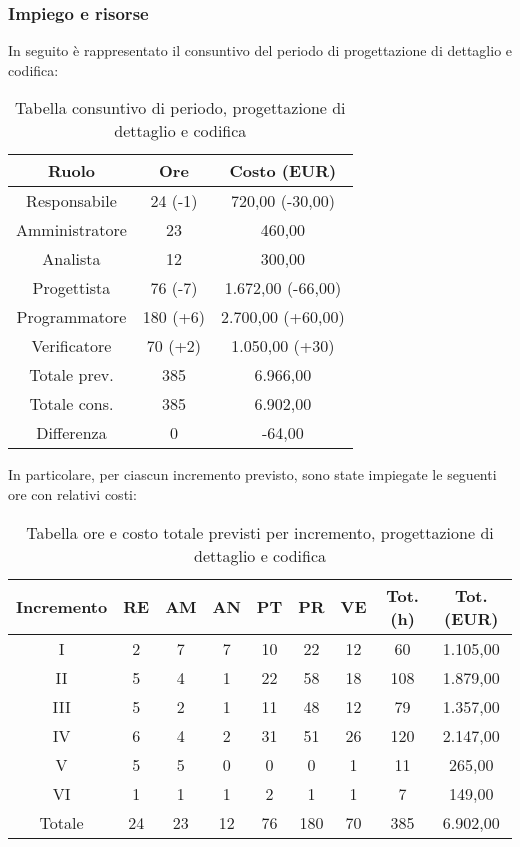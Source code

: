\subsubsection{Impiego e risorse}
In seguito è rappresentato il consuntivo del periodo di progettazione di dettaglio e codifica:
\begin{table}[h]
	\caption{Tabella consuntivo di periodo, progettazione di dettaglio e codifica}  
	\begin{center}
		\begin{tabular}{ |c|c|c|  }
			\hline
			Ruolo 		& Ore & Costo (EUR)\\
			\hline\hline
			Responsabile	& 24 (-1) & 720,00 (-30,00)\\
			Amministratore	& 23 & 460,00\\
			Analista		& 12 & 300,00\\
			Progettista		& 76 (-7) & 1.672,00 (-66,00)\\
			Programmatore	& 180 (+6) & 2.700,00 (+60,00)\\
			Verificatore	& 70 (+2) & 1.050,00 (+30)\\
			\hline\hline
			Totale prev.	& 385 & 6.966,00 \\
			Totale cons.	& 385 & 6.902,00 \\
			Differenza		& 0 & -64,00 \\
			\hline
		\end{tabular}
	\end{center}
\end{table}
\noindent In particolare, per ciascun incremento previsto, sono state impiegate le seguenti ore con relativi costi:

\begin{table}[h]
	\caption{Tabella ore e costo totale previsti per incremento, progettazione di dettaglio e codifica}
	\begin{center}
		\begin{tabular}{ |c|c|c|c|c|c|c|c|c|  }
			\hline
			Incremento 		& RE 	& AM 	& AN 	& PT 	& PR 	& VE 	& Tot. (h) & Tot. (EUR) \\
			\hline\hline
			I		& 2 		& 7			& 7 	& 10 	& 22 		& 12 		& 60	 & 1.105,00\\
			II		& 5 		& 4 		& 1 	& 22	& 58 		& 18 		&108	&1.879,00\\
			III		& 5 		& 2 		& 1 	& 11	& 48 		& 12 		& 79	&1.357,00\\
			IV		& 6 		& 4 		& 2 	& 31 	& 51 		& 26 		& 120 	&2.147,00\\
			V		& 5 		& 5 		& 0 	& 0		& 0 		& 1	 		& 11			&265,00\\
			VI		& 1 		& 1 		& 1 	& 2 	& 1 		& 1 		& 7			&149,00\\
			\hline\hline
			Totale		& 24		& 23		& 12 	& 76	 	& 180 	& 70 	& 385 	&6.902,00\\
			\hline
		\end{tabular}
	\end{center}
\end{table}

